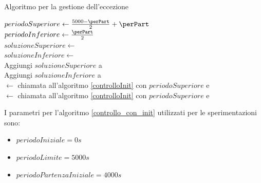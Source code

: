 \documentclass[a4paper,12pt]{report}
\begin{document}
\begin{algorithm}[H]
  \caption{Algoritmo per la gestione dell'eccezione}
  \label{eccezione}

  \BlankLine
  $periodoSuperiore \leftarrow \frac{5000 - \perPart}{2} + \perPart$ \\
  $periodoInferiore \leftarrow \frac{\perPart}{2}$ \\
  $soluzioneSuperiore\leftarrow$  \\
  $soluzioneInferiore\leftarrow$  \\
  Aggiungi $soluzioneSuperiore$ a \Soluzioni \\
  Aggiungi $soluzioneInferiore$ a \Soluzioni \\
   {
    \perPart $\leftarrow$ chiamata all'algoritmo \ref{controlloInit} con $periodoSuperiore$ e \perPart  \\
  }{
    \perPart $\leftarrow$ chiamata all'algoritmo \ref{controlloInit} con $periodoSuperiore$ e \perPart \\
  }
\end{algorithm}


I parametri per l'algoritmo \ref{controllo_con_init} utilizzati per le sperimentazioni sono:
\begin{itemize}
  \item $periodoIniziale = 0s$
  \item $periodoLimite = 5000s$
  \item $periodoPartenzaIniziale = 4000s$
\end{itemize}
\end{document}
